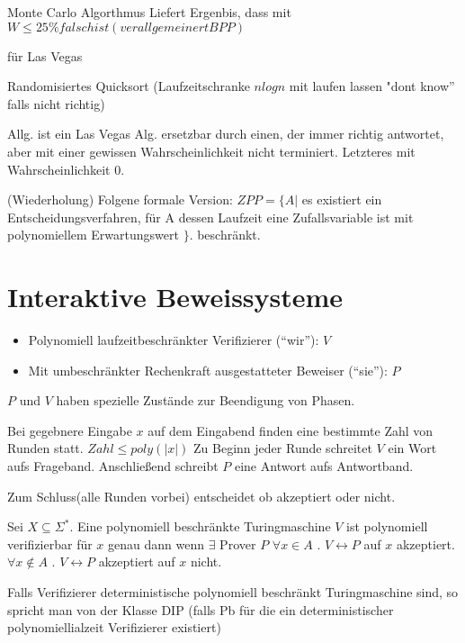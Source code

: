 Monte Carlo Algorthmus Liefert Ergenbis, dass mit $W \leq 25\% falsch ist (verallgemeinert BPP)$

\begin{beispiel}
für Las Vegas

Randomisiertes Quicksort (Laufzeitschranke $n log n$ mit laufen lassen
"dont know'' falls nicht richtig)
\end{beispiel}

Allg. ist ein Las Vegas Alg. ersetzbar durch einen, der immer richtig
antwortet, aber mit einer gewissen Wahrscheinlichkeit nicht
terminiert. Letzteres mit Wahrscheinlichkeit $0$.

(Wiederholung)
Folgene formale Version:
$ZPP = \{A |$ es existiert ein Entscheidungsverfahren, für A dessen Laufzeit eine Zufallsvariable ist mit polynomiellem Erwartungswert $\}$. beschränkt.      

\section{Interaktive Beweissysteme} 
\begin{itemize}
\item Polynomiell laufzeitbeschränkter Verifizierer (``wir''): $V$
\item Mit umbeschränkter Rechenkraft ausgestatteter Beweiser (``sie''): $P$
\end{itemize}


$P$ und $V$ haben spezielle Zustände zur Beendigung von Phasen.

Bei gegebnere Eingabe $x$ auf dem Eingabend finden eine bestimmte Zahl von Runden statt.
$Zahl \leq poly (|x|)$
Zu Beginn jeder Runde schreitet $V$ ein Wort aufs Frageband. Anschließend schreibt $P$ eine Antwort aufs Antwortband.

Zum Schluss(alle Runden vorbei) entscheidet ob akzeptiert oder nicht.

\begin{definition}
Sei $X \subseteq \Sigma^*$. Eine polynomiell beschränkte Turingmaschine $V$ ist polynomiell verifizierbar für $x$
genau dann wenn $ \exists$ Prover $P$
$\forall x \in A$ . $V \leftrightarrow P$ auf $x$ akzeptiert. $\forall x \notin A$ . $V \leftrightarrow P$   akzeptiert auf $x$ nicht.

Falls Verifizierer deterministische polynomiell beschränkt
Turingmaschine sind, so spricht man von der Klasse DIP (falls Pb für
die ein deterministischer polynomiellialzeit Verifizierer existiert)
\end{definition}

